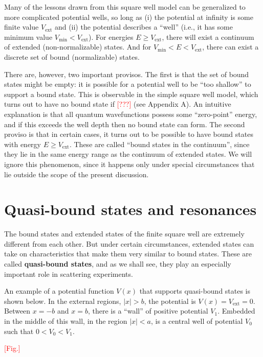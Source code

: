 \documentclass[pra,11pt]{revtex4}
\begin{document}
Many of the lessons drawn from this square well model can be
generalized to more complicated potential wells, so long as (i) the
potential at infinity is some finite value $V_{\textrm{ext}}$ and (ii)
the potential describes a ``well'' (i.e., it has some minimum value
$V_{\mathrm{min}} < V_{\textrm{ext}}$).  For energies $E \ge
V_{\textrm{ext}}$, there will exist a continuum of extended
(non-normalizable) states.  And for $V_{\mathrm{min}} < E <
V_{\textrm{ext}}$, there can exist a discrete set of bound
(normalizable) states.

There are, however, two important provisos.  The first is that the set
of bound states might be empty: it is possible for a potential well to
be ``too shallow'' to support a bound state.  This is observable in
the simple square well model, which turns out to have no bound state
if \textcolor{red}{[???]} (see Appendix A).  An intuitive explanation
is that all quantum wavefunctions possess some ``zero-point'' energy,
and if this exceeds the well depth then no bound state can form.  The
second proviso is that in certain cases, it turns out to be possible
to have bound states with energy $E \ge V_{\textrm{ext}}$.  These are
called ``bound states in the continuum'', since they lie in the same
energy range as the continuum of extended states.  We will ignore this
phenomenon, since it happens only under special circumstances that lie
outside the scope of the present discussion.

\section{Quasi-bound states and resonances}

The bound states and extended states of the finite square well are
extremely different from each other.  But under certain circumstances,
extended states can take on characteristics that make them very
similar to bound states.  These are called \textbf{quasi-bound
  states}, and as we shall see, they play an especially important role
in scattering experiments.

An example of a potential function $V(x)$ that supports quasi-bound
states is shown below.  In the external regions, $|x| > b$, the
potential is $V(x) = V_{\textrm{ext}} = 0$.  Between $x = -b$ and $x =
b$, there is a ``wall'' of positive potential $V_1$.  Embedded in the
middle of this wall, in the region $|x| < a$, is a central well of
potential $V_0$ such that $0 < V_0 < V_1$.

\textcolor{red}{[Fig.]}
\end{document}
